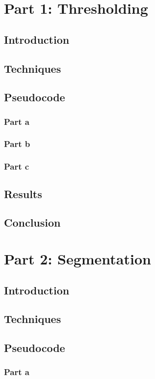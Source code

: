 \documentclass[a4paper]{article}
\begin{document}
	\section{Part 1: Thresholding}
	\subsection{Introduction}
	\subsection{Techniques}
	\subsection{Pseudocode}
	\subsubsection{Part a}
	\subsubsection{Part b}
	\subsubsection{Part c}
	\subsection{Results}
	\subsection{Conclusion}
	\section{Part 2: Segmentation}
	\subsection{Introduction}
	\subsection{Techniques}
	\subsection{Pseudocode}
	\subsubsection{Part a}
\end{document}
